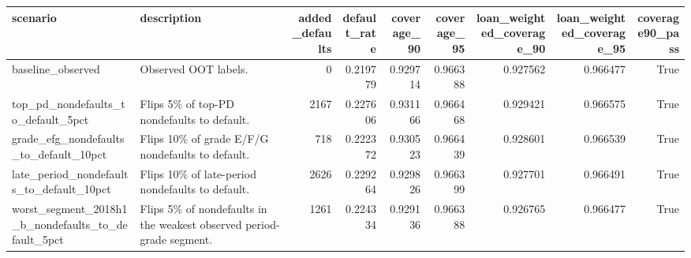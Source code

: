 \begin{tabular}{llrrrrrrr}
\toprule
scenario & description & added\_defaults & default\_rate & coverage\_90 & coverage\_95 & loan\_weighted\_coverage\_90 & loan\_weighted\_coverage\_95 & coverage90\_pass \\
\midrule
baseline\_observed & Observed OOT labels. & 0 & 0.219779 & 0.929714 & 0.966388 & 0.927562 & 0.966477 & True \\
top\_pd\_nondefaults\_to\_default\_5pct & Flips 5\% of top-PD nondefaults to default. & 2167 & 0.227606 & 0.931166 & 0.966468 & 0.929421 & 0.966575 & True \\
grade\_efg\_nondefaults\_to\_default\_10pct & Flips 10\% of grade E/F/G nondefaults to default. & 718 & 0.222372 & 0.930523 & 0.966439 & 0.928601 & 0.966539 & True \\
late\_period\_nondefaults\_to\_default\_10pct & Flips 10\% of late-period nondefaults to default. & 2626 & 0.229264 & 0.929826 & 0.966399 & 0.927701 & 0.966491 & True \\
worst\_segment\_2018h1\_b\_nondefaults\_to\_default\_5pct & Flips 5\% of nondefaults in the weakest observed period-grade segment. & 1261 & 0.224334 & 0.929136 & 0.966388 & 0.926765 & 0.966477 & True \\
\bottomrule
\end{tabular}
